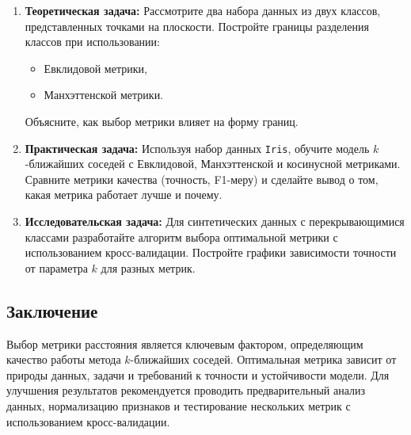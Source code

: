 \begin{enumerate}
    \item \textbf{Теоретическая задача:}  
    Рассмотрите два набора данных из двух классов, представленных точками на плоскости.  
    Постройте границы разделения классов при использовании:
    \begin{itemize}
        \item Евклидовой метрики,
        \item Манхэттенской метрики.
    \end{itemize}
    Объясните, как выбор метрики влияет на форму границ.

    \item \textbf{Практическая задача:}  
    Используя набор данных \texttt{Iris}, обучите модель \(k\)-ближайших соседей с Евклидовой, Манхэттенской и косинусной метриками. Сравните метрики качества (точность, F1-меру) и сделайте вывод о том, какая метрика работает лучше и почему.

    \item \textbf{Исследовательская задача:}  
    Для синтетических данных с перекрывающимися классами разработайте алгоритм выбора оптимальной метрики с использованием кросс-валидации. Постройте графики зависимости точности от параметра \(k\) для разных метрик.
\end{enumerate}

\subsection{Заключение}

Выбор метрики расстояния является ключевым фактором, определяющим качество работы метода \(k\)-ближайших соседей. Оптимальная метрика зависит от природы данных, задачи и требований к точности и устойчивости модели. Для улучшения результатов рекомендуется проводить предварительный анализ данных, нормализацию признаков и тестирование нескольких метрик с использованием кросс-валидации.
